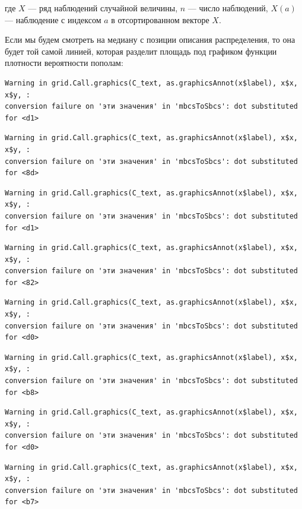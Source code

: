 \documentclass[
  letterpaper,
]{scrbook}
\theoremstyle{definition}
\theoremstyle{remark}
\begin{document}
где \(X\) --- ряд наблюдений случайной величины, \(n\) --- число
наблюдений, \(X(a)\) --- наблюдение с индексом \(a\) в отсортированном
векторе \(X\).

Если мы будем смотреть на медиану с позиции описания распределения, то
она будет той самой линией, которая разделит площадь под графиком
функции плотности вероятности пополам:

\begin{verbatim}
Warning in grid.Call.graphics(C_text, as.graphicsAnnot(x$label), x$x, x$y, :
conversion failure on 'эти значения' in 'mbcsToSbcs': dot substituted for <d1>
\end{verbatim}

\begin{verbatim}
Warning in grid.Call.graphics(C_text, as.graphicsAnnot(x$label), x$x, x$y, :
conversion failure on 'эти значения' in 'mbcsToSbcs': dot substituted for <8d>
\end{verbatim}

\begin{verbatim}
Warning in grid.Call.graphics(C_text, as.graphicsAnnot(x$label), x$x, x$y, :
conversion failure on 'эти значения' in 'mbcsToSbcs': dot substituted for <d1>
\end{verbatim}

\begin{verbatim}
Warning in grid.Call.graphics(C_text, as.graphicsAnnot(x$label), x$x, x$y, :
conversion failure on 'эти значения' in 'mbcsToSbcs': dot substituted for <82>
\end{verbatim}

\begin{verbatim}
Warning in grid.Call.graphics(C_text, as.graphicsAnnot(x$label), x$x, x$y, :
conversion failure on 'эти значения' in 'mbcsToSbcs': dot substituted for <d0>
\end{verbatim}

\begin{verbatim}
Warning in grid.Call.graphics(C_text, as.graphicsAnnot(x$label), x$x, x$y, :
conversion failure on 'эти значения' in 'mbcsToSbcs': dot substituted for <b8>
\end{verbatim}

\begin{verbatim}
Warning in grid.Call.graphics(C_text, as.graphicsAnnot(x$label), x$x, x$y, :
conversion failure on 'эти значения' in 'mbcsToSbcs': dot substituted for <d0>
\end{verbatim}

\begin{verbatim}
Warning in grid.Call.graphics(C_text, as.graphicsAnnot(x$label), x$x, x$y, :
conversion failure on 'эти значения' in 'mbcsToSbcs': dot substituted for <b7>
\end{verbatim}
\end{document}
